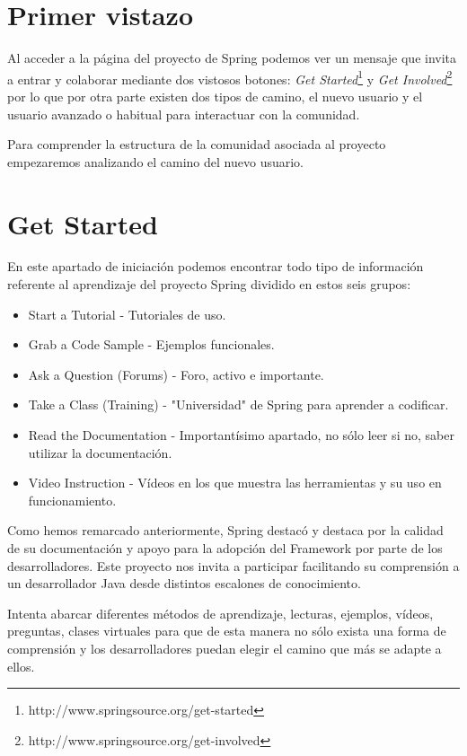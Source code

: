 \documentclass[11pt]{scrartcl}
\begin{document}
\section{Primer vistazo}

Al acceder a la p\'agina del proyecto de Spring podemos ver un mensaje que invita a entrar y colaborar mediante dos vistosos botones: \emph{Get Started}\footnote{http://www.springsource.org/get-started} y \emph{Get Involved}\footnote{http://www.springsource.org/get-involved} por lo que por otra parte existen dos tipos de camino, el nuevo usuario y el usuario avanzado o habitual para interactuar con la comunidad.

Para comprender la estructura de la comunidad asociada al proyecto empezaremos analizando el camino del nuevo usuario.

\section{Get Started}

En este apartado de iniciaci\'on podemos encontrar todo tipo de informaci\'on referente al aprendizaje del proyecto Spring dividido en estos seis grupos:

\begin{itemize}
    \item Start a Tutorial - Tutoriales de uso.
    \item Grab a Code Sample - Ejemplos funcionales.
    \item Ask a Question (Forums) - Foro, activo e importante.
    \item Take a Class (Training) - "Universidad" de Spring para aprender a codificar.
    \item Read the Documentation - Important\'isimo apartado, no s\'olo leer si no, saber utilizar la documentaci\'on.
    \item Video Instruction - V\'ideos en los que muestra las herramientas y su uso en funcionamiento.
\end{itemize}

Como hemos remarcado anteriormente, Spring destac\'o y destaca por la calidad de su documentaci\'on y apoyo para la adopci\'on del Framework por parte de los desarrolladores.
Este proyecto nos invita a participar facilitando su comprensi\'on a un desarrollador Java desde distintos escalones de conocimiento.

Intenta abarcar diferentes m\'etodos de aprendizaje, lecturas, ejemplos, vídeos, preguntas, clases virtuales para que de esta manera no s\'olo exista una forma de comprensi\'on y los desarrolladores puedan elegir el camino que m\'as se adapte a ellos.
\end{document}
